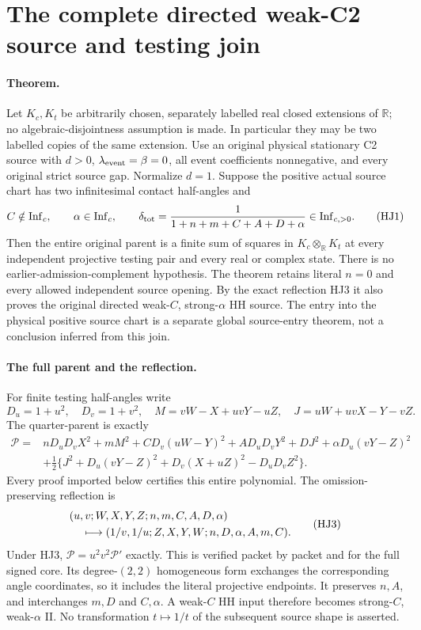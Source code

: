 \section{The complete directed weak-C2 source and testing join}
\label{sec:weak-c2-complete-join-rederived}

\paragraph{Theorem.}
Let \(K_c,K_t\) be arbitrarily chosen, separately labelled
real closed extensions of \(\mathbb R\); no
algebraic-disjointness assumption is made.  In particular
they may be two labelled copies of the same extension.
Use an original physical stationary C2 source
with \(d>0\), \(\lambda_{\rm event}=\beta=0\), all event
coefficients nonnegative, and every original strict source gap.
Normalize \(d=1\).  Suppose the positive actual source chart
has two infinitesimal contact half-angles and
\[
 C\notin\mathrm{Inf}_c,\qquad
 \alpha\in\mathrm{Inf}_c,\qquad
 \delta_{\rm tot}
   =\frac1{1+n+m+C+A+D+\alpha}\in\mathrm{Inf}_{c,>0}.
 \tag{HJ1}
\]
Then the entire original parent is a finite sum of squares in
\(K_c\otimes_{\mathbb R}K_t\) at every independent projective
testing pair and every real or complex state.
There is no earlier-admission-complement hypothesis.
The theorem retains literal \(n=0\) and every allowed
independent source opening.
By the exact reflection HJ3 it also proves the original
directed weak-\(C\), strong-\(\alpha\) HH source.
The entry into the physical positive source chart is a
separate global source-entry theorem, not a conclusion
inferred from this join.

\paragraph{The full parent and the reflection.}
For finite testing half-angles write
\[
 D_u=1+u^2,\quad D_v=1+v^2,\quad
 M=vW-X+uvY-uZ,\quad J=uW+uvX-Y-vZ .
\]
The quarter-parent is exactly
\[
\begin{split}
 \mathcal P={}&nD_uD_vX^2+mM^2+CD_v(uW-Y)^2
       +AD_uD_vY^2+DJ^2+\alpha D_u(vY-Z)^2\\
 &+\tfrac12\{J^2+D_u(vY-Z)^2+D_v(X+uZ)^2-D_uD_vZ^2\}.
\end{split}
\tag{HJ2}
\]
Every proof imported below certifies this entire polynomial.
The omission-preserving reflection is
\[
\begin{split}
 &(u,v;W,X,Y,Z;n,m,C,A,D,\alpha)\\
 &\hspace{4mm}\longmapsto
 (1/v,1/u;Z,X,Y,W;n,D,\alpha,A,m,C).
\end{split}
\tag{HJ3}
\]
Under HJ3, \(\mathcal P=u^2v^2\mathcal P'\) exactly.
This is verified packet by packet and for the full signed
core.  Its degree-\((2,2)\) homogeneous form exchanges
the corresponding angle coordinates, so it includes
the literal projective endpoints.
It preserves \(n,A\), and interchanges \(m,D\) and
\(C,\alpha\).  A weak-\(C\) HH input therefore becomes
strong-\(C\), weak-\(\alpha\) II.
No transformation \(t\mapsto1/t\) of the subsequent
source shape is asserted.

